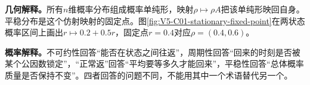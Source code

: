 \documentclass[UTF8,a4paper,11pt,openany]{ctexbook}
\begin{document}
\setcounter{page}{708}
\setcounter{chapter}{30}
\setcounter{figure}{3}
\pagestyle{headings}
\textbf{几何解释。}所有$n$维概率分布组成概率单纯形，映射$\rho\mapsto\rho A$把该单纯形映回自身。平稳分布是这个仿射映射的固定点。图\ref{fig:V5-C01-stationary-fixed-point}在两状态概率区间上画出$r\mapsto0.2+0.5r$，固定点$r=0.4$对应$\rho=(0.4,0.6)$。

\textbf{概率解释。}不可约性回答“能否在状态之间往返”，周期性回答“回来的时刻是否被某个公因数锁定”，“正常返”回答“平均要等多久才能回来”，平稳性回答“总体概率质量是否保持不变”。四者回答的问题不同，不能用其中一个术语替代另一个。
\end{document}

